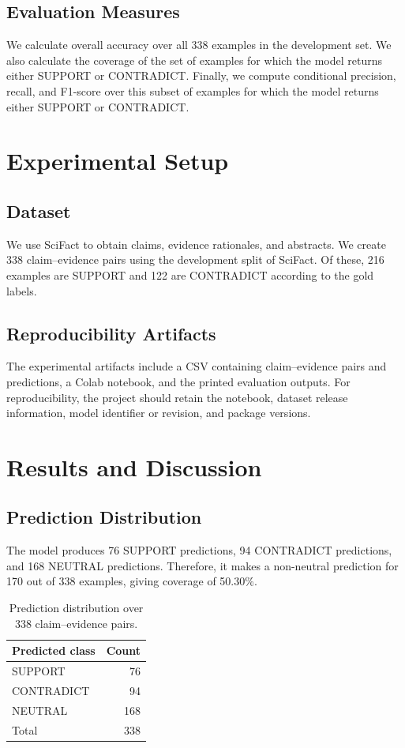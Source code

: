 \documentclass[conference]{IEEEtran}
\begin{document}
\subsection{Evaluation Measures}
We calculate overall accuracy over all 338 examples in the development set. We also calculate the coverage of the set of examples for which the model returns either SUPPORT or CONTRADICT. Finally, we compute conditional precision, recall, and F1-score over this subset of examples for which the model returns either SUPPORT or CONTRADICT.

\section{Experimental Setup}

\subsection{Dataset}
We use SciFact to obtain claims, evidence rationales, and abstracts. We create 338 claim--evidence pairs using the development split of SciFact. Of these, 216 examples are SUPPORT and 122 are CONTRADICT according to the gold labels.

\subsection{Reproducibility Artifacts}
The experimental artifacts include a CSV containing claim--evidence pairs and predictions, a Colab notebook, and the printed evaluation outputs. For reproducibility, the project should retain the notebook, dataset release information, model identifier or revision, and package versions.

\section{Results and Discussion}

\subsection{Prediction Distribution}
The model produces 76 SUPPORT predictions, 94 CONTRADICT predictions, and 168 NEUTRAL predictions. Therefore, it makes a non-neutral prediction for 170 out of 338 examples, giving coverage of 50.30\%.

\begin{table}[t]
\centering
\caption{Prediction distribution over 338 claim--evidence pairs.}
\label{tab:prediction-distribution}
\begin{tabular}{lr}
\toprule
\textbf{Predicted class} & \textbf{Count}\\
\midrule
SUPPORT & 76\\
CONTRADICT & 94\\
NEUTRAL & 168\\
\midrule
Total & 338\\
\bottomrule
\end{tabular}
\end{table}
\end{document}
